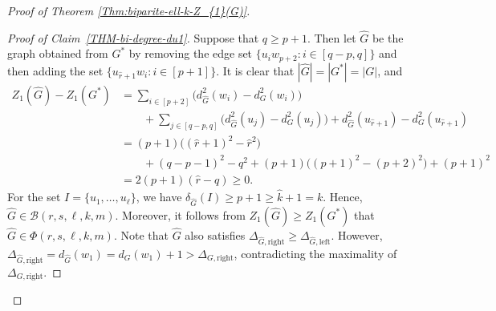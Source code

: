 \documentclass[11pt,a4paper]{article}
\begin{document}
\begin{proof}[Proof of Theorem \ref{Thm:biparite-ell-k-Z_{1}(G)}]
\begin{proof}[Proof of Claim~\ref{THM-bi-degree-du1}]
        Suppose that $q \ge p+1$. 
        Then let $\hat{G}$ be the graph obtained from $G^{\ast}$ by removing the edge set $\{u_i w_{p+2} \colon i \in [q-p, q]\}$ and then adding the set $\{u_{\hat{r}+1} w_i \colon i \in [p+1]\}$. 
        It is clear that $|\hat{G}| = |G^{\ast}| = |G|$, and 
        \begin{align*}
            Z_{1}(\hat{G}) - Z_{1}(G^{\ast})
            & = \sum_{i \in [p+2]} \big( d_{\hat{G}}^{2}(w_i) - d_{G}^{2}(w_i) \big) \\
            & \qquad + \sum_{j \in [q-p, q]} \big( d_{\hat{G}}^{2}(u_j) - d_{G}^{2}(u_j) \big) + d_{\hat{G}}^{2}(u_{\hat{r}+1}) - d_{G}^{2}(u_{\hat{r}+1}) \\
            & = (p+1)\big( (\hat{r}+1)^2 - \hat{r}^2 \big) \\
            & \qquad + (q-p-1)^2 - q^2 + (p+1) \big( (p+1)^2 - (p+2)^2 \big) + (p+1)^2 \\
            & = 2(p+1)(\hat{r} - q)
            \ge 0. 
        \end{align*}
        For the set $I = \{u_1, \ldots,u_{\ell}\}$, we have $\delta_{\hat{G}}(I) \ge p+1 \ge \hat{k}+1 =k$. 
        Hence, $\hat{G} \in \mathcal{B}(r,s,\ell,k,m)$. 
        Moreover, it follows from $Z_{1}(\hat{G}) \ge Z_{1}(G^{\ast})$ that $\hat{G} \in \Phi(r,s,\ell,k,m)$. 
        Note that $\hat{G}$ also satisfies $\Delta_{\hat{G}, \mathrm{right}} \ge \Delta_{\hat{G}, \mathrm{left}}$. 
        However, $\Delta_{\hat{G},\mathrm{right}} = d_{\hat{G}}(w_1) = d_{G}(w_1) + 1 > \Delta_{G,\mathrm{right}}$, contradicting the maximality of $\Delta_{G,\mathrm{right}}$. 


\end{proof}
\end{proof}
\end{document}
